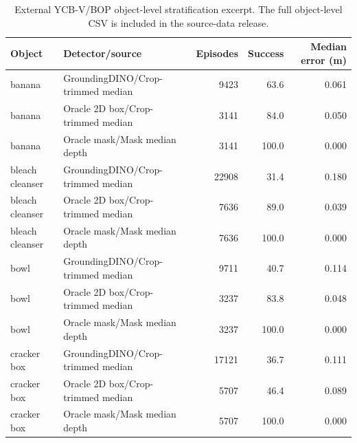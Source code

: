 \begin{table}[t]
\centering
\caption{External YCB-V/BOP object-level stratification excerpt. The full object-level CSV is included in the source-data release.}
\label{tab:external-rgbd-by-object}
\scriptsize
\begin{tabular}{llrrr}
\toprule
Object & Detector/source & Episodes & Success & Median error (m) \\
\midrule
banana & GroundingDINO/Crop-trimmed median & 9423 & 63.6 & 0.061 \\
banana & Oracle 2D box/Crop-trimmed median & 3141 & 84.0 & 0.050 \\
banana & Oracle mask/Mask median depth & 3141 & 100.0 & 0.000 \\
bleach cleanser & GroundingDINO/Crop-trimmed median & 22908 & 31.4 & 0.180 \\
bleach cleanser & Oracle 2D box/Crop-trimmed median & 7636 & 89.0 & 0.039 \\
bleach cleanser & Oracle mask/Mask median depth & 7636 & 100.0 & 0.000 \\
bowl & GroundingDINO/Crop-trimmed median & 9711 & 40.7 & 0.114 \\
bowl & Oracle 2D box/Crop-trimmed median & 3237 & 83.8 & 0.048 \\
bowl & Oracle mask/Mask median depth & 3237 & 100.0 & 0.000 \\
cracker box & GroundingDINO/Crop-trimmed median & 17121 & 36.7 & 0.111 \\
cracker box & Oracle 2D box/Crop-trimmed median & 5707 & 46.4 & 0.089 \\
cracker box & Oracle mask/Mask median depth & 5707 & 100.0 & 0.000 \\
\bottomrule
\end{tabular}
\end{table}

